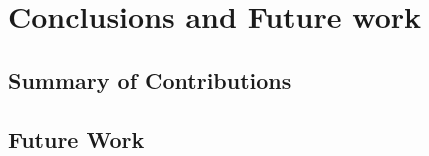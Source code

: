 \chapter{Conclusions and Future work}
\label{conclusion}
\section{Summary of Contributions}
\section{Future Work}

\blindtext
